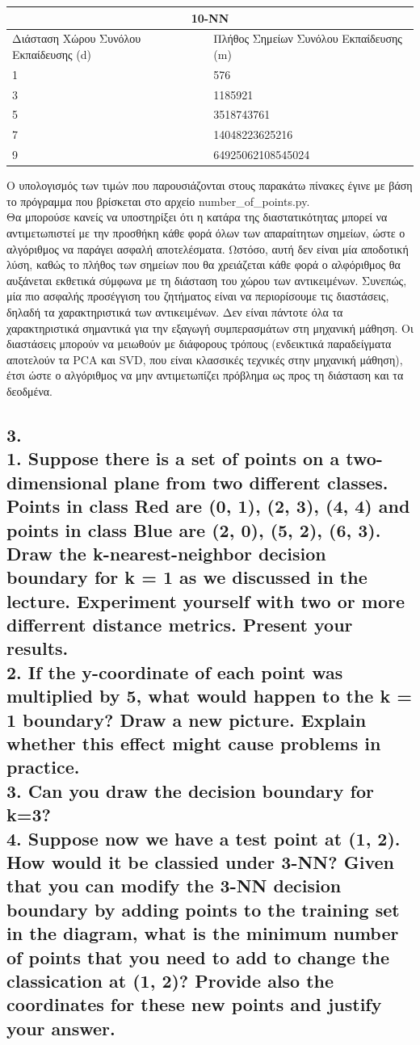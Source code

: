 \documentclass[12pt]{article}
\begin{document}
\medspace

\begin{tabular}{ |p{8cm}|p{8cm}|  }
	\hline
	\multicolumn{2}{|c|}{10-NN} \\
	\hline
	Διάσταση Χώρου Συνόλου Εκπαίδευσης (d) & Πλήθος Σημείων Συνόλου Εκπαίδευσης (m)\\
	\hline
	1   & 576    \\
	3   & 1185921    \\
	5   & 3518743761    \\
	7   & 14048223625216    \\
	9   & 64925062108545024    \\
	\hline
\end{tabular}

\medspace

Ο υπολογισμός των τιμών που παρουσιάζονται στους παρακάτω πίνακες έγινε με βάση το πρόγραμμα που βρίσκεται στο αρχείο number\_of\_points.py. \\

Θα μπορούσε κανείς να υποστηρίξει ότι η κατάρα της διαστατικότητας μπορεί να αντιμετωπιστεί με την προσθήκη κάθε φορά όλων των απαραίτητων σημείων, ώστε ο αλγόριθμος να παράγει ασφαλή αποτελέσματα. Ωστόσο, αυτή δεν είναι μία αποδοτική λύση, καθώς το πλήθος των σημείων που θα χρειάζεται κάθε φορά ο αλφόριθμος θα αυξάνεται εκθετικά σύμφωνα με τη διάσταση του χώρου των αντικειμένων. Συνεπώς, μία πιο ασφαλής προσέγγιση του ζητήματος είναι να περιορίσουμε τις διαστάσεις, δηλαδή τα χαρακτηριστικά των αντικειμένων. Δεν είναι πάντοτε όλα τα χαρακτηριστικά σημαντικά για την εξαγωγή συμπερασμάτων στη μηχανική μάθηση. Οι διαστάσεις μπορούν να μειωθούν με διάφορους τρόπους (ενδεικτικά παραδείγματα αποτελούν τα PCA και SVD, που είναι κλασσικές τεχνικές στην μηχανική μάθηση), έτσι ώστε ο αλγόριθμος να μην αντιμετωπίζει πρόβλημα ως προς τη διάσταση και τα δεοδμένα. 

\pagebreak

\subsection*{3. \\ 1. Suppose there is a set of points on a two-dimensional plane from two different classes.
	Points in class Red are (0, 1), (2, 3), (4, 4) and points in class Blue are (2, 0), (5, 2),
	(6, 3). Draw the k-nearest-neighbor decision boundary for k = 1 as we discussed in the
	lecture. Experiment yourself with two or more differrent distance metrics. Present your
	results. \\
	2. If the y-coordinate of each point was multiplied by 5, what would happen to the k =
	1 boundary? Draw a new picture. Explain whether this effect might cause problems in
	practice.
\\
	3. Can you draw the decision boundary for k=3?
\\
	4. Suppose now we have a test point at (1, 2). How would it be classied under 3-NN? Given
	that you can modify the 3-NN decision boundary by adding points to the training set in
	the diagram, what is the minimum number of points that you need to add to change the
	classication at (1, 2)? Provide also the coordinates for these new points and justify your
	answer.}
\end{document}
